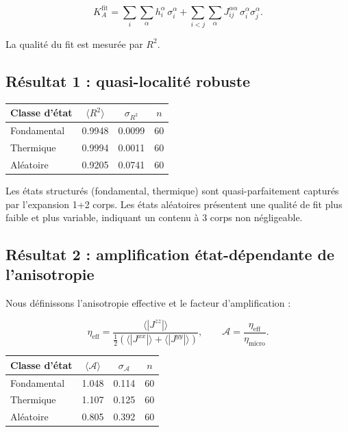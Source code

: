 \documentclass[11pt]{article}
\begin{document}
\[
K_A^{\mathrm{fit}} =
\sum_i \sum_{\alpha} h_i^\alpha\,\sigma_i^\alpha
+ \sum_{i<j}\sum_{\alpha} J_{ij}^{\alpha\alpha}\,\sigma_i^\alpha\sigma_j^\alpha.
\]

La qualité du fit est mesurée par $R^2$.

\subsection{Résultat 1 : quasi-localité robuste}

\begin{center}
\begin{tabular}{lccc}
\toprule
Classe d'état & $\langle R^2\rangle$ & $\sigma_{R^2}$ & $n$ \\
\midrule
Fondamental & 0.9948 & 0.0099 & 60 \\
Thermique   & 0.9994 & 0.0011 & 60 \\
Aléatoire   & 0.9205 & 0.0741 & 60 \\
\bottomrule
\end{tabular}
\end{center}

Les états structurés (fondamental, thermique) sont quasi-parfaitement capturés par l'expansion 1+2 corps. Les états aléatoires présentent une qualité de fit plus faible et plus variable, indiquant un contenu à 3 corps non négligeable.

\subsection{Résultat 2 : amplification état-dépendante de l'anisotropie}

Nous définissons l'anisotropie effective et le facteur d'amplification :

\[
\eta_{\mathrm{eff}} = \frac{\langle |J^{zz}|\rangle}{\tfrac{1}{2}(\langle |J^{xx}|\rangle + \langle |J^{yy}|\rangle)},
\qquad
\mathcal{A} = \frac{\eta_{\mathrm{eff}}}{\eta_{\mathrm{micro}}}.
\]

\begin{center}
\begin{tabular}{lccc}
\toprule
Classe d'état & $\langle\mathcal{A}\rangle$ & $\sigma_{\mathcal{A}}$ & $n$ \\
\midrule
Fondamental & 1.048 & 0.114 & 60 \\
Thermique   & 1.107 & 0.125 & 60 \\
Aléatoire   & 0.805 & 0.392 & 60 \\
\bottomrule
\end{tabular}
\end{center}
\end{document}
